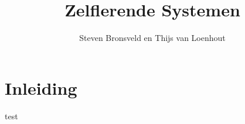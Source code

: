 \documentclass[a4paper]{article}
\title{Zelflerende Systemen}
\author{Steven Bronsveld en Thijs van Loenhout}
\begin{document}
\maketitle

\renewcommand{\contentsname}{Inhoud}

\tableofcontents
\newpage

\section{Inleiding}


\newpage
test

\newpage


\newpage
\end{document}
